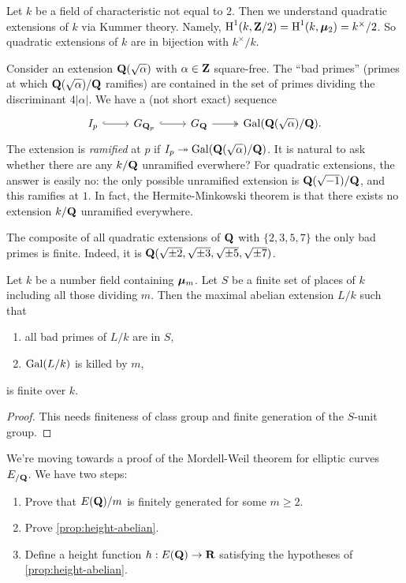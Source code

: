 Let $k$ be a field of characteristic not equal to $2$. Then we understand 
quadratic extensions of $k$ via Kummer theory. Namely, 
$\operatorname{H}^1(k,\mathbf{Z}/2) = \operatorname{H}^1(k,{\bm\mu}_2) = k^\times/2$. So quadratic extensions of $k$ 
are in bijection with $k^\times/k$. 

Consider an extension $\mathbf{Q}(\sqrt{\alpha})$ with $\alpha\in \mathbf{Z}$ square-free. 
The ``bad primes'' (primes at which $\mathbf{Q}(\sqrt{\alpha})/\mathbf{Q}$ ramifies) are 
contained in the set of primes dividing the discriminant $4|\alpha|$. We have 
a (not short exact) sequence
\[\begin{tikzcd}
  I_p \ar[r, hook]
    & G_{\dQ_p} \ar[r, hook]
    & G_\dQ \ar[r, two heads]
    & \galois(\dQ(\sqrt{\alpha})/\dQ) .
\end{tikzcd}\]
The extension is \emph{ramified} at $p$ if 
$I_p \twoheadrightarrow \operatorname{Gal}(\mathbf{Q}(\sqrt{\alpha})/\mathbf{Q})$. It is natural to ask whether there 
are any $k/\mathbf{Q}$ unramified everwhere? For quadratic extensions, the answer is 
easily no: the only possible unramified extension is $\mathbf{Q}(\sqrt{-1})/\mathbf{Q}$, and 
this ramifies at $1$. In fact, the Hermite-Minkowski theorem is that there 
exists no extension $k/\mathbf{Q}$ unramified everywhere. 

The composite of all quadratic extensions of $\mathbf{Q}$ with $\{2,3,5,7\}$ the only 
bad primes is finite. Indeed, it is 
$\mathbf{Q}(\sqrt{\pm 2},\sqrt{\pm 3},\sqrt{\pm 5},\sqrt{\pm 7})$. 

\begin{theorem}\label{thm:finite-abelian-ext}
Let $k$ be a number field containing ${\bm\mu}_m$. Let $S$ be a finite set of 
places of $k$ including all those dividing $m$. Then the maximal abelian 
extension $L/k$ such that 
\begin{enumerate}
  \item all bad primes of $L/k$ are in $S$, 
  \item $\operatorname{Gal}(L/k)$ is killed by $m$, 
\end{enumerate}
is finite over $k$. 
\end{theorem}
\begin{proof}
This needs finiteness of class group and finite generation of the 
$S$-unit group. 
\end{proof}

We're moving towards a proof of the Mordell-Weil theorem for elliptic curves 
$E_{/\mathbf{Q}}$. We have two steps:
\begin{enumerate}
\item Prove that $E(\mathbf{Q})/m$ is finitely generated for some $m\geqslant 2$. 

\item Prove \autoref{prop:height-abelian}. 

\item Define a height function $h:E(\mathbf{Q})\to \mathbf{R}$ satisfying the hypotheses 
of \autoref{prop:height-abelian}. 
\end{enumerate}

